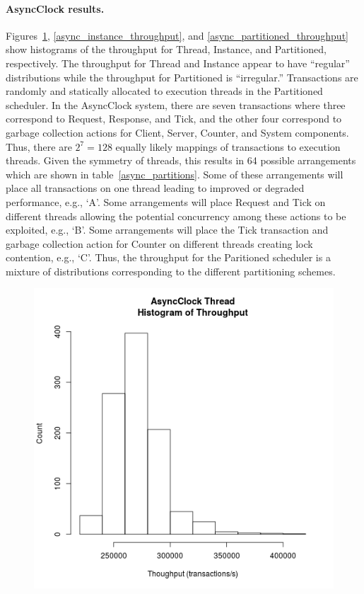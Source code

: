\paragraph{AsyncClock results.}
Figures~\ref{async_thread_throughput}, \ref{async_instance_throughput}, and \ref{async_partitioned_throughput} show histograms of the throughput for Thread, Instance, and Partitioned, respectively.
The throughput for Thread and Instance appear to have ``regular'' distributions while the throughput for Partitioned is ``irregular.''
Transactions are randomly and statically allocated to execution threads in the Partitioned scheduler.
In the AsyncClock system, there are seven transactions where three correspond to Request, Response, and Tick, and the other four correspond to garbage collection actions for Client, Server, Counter, and System components.
Thus, there are $2^7 = 128$ equally likely mappings of transactions to execution threads.
Given the symmetry of threads, this results in 64 possible arrangements which are shown in table~\ref{async_partitions}.
Some of these arrangements will place all transactions on one thread leading to improved or degraded performance, e.g., `A'.
Some arrangements will place Request and Tick on different threads allowing the potential concurrency among these actions to be exploited, e.g., `B'.
Some arrangements will place the Tick transaction and garbage collection action for Counter on different threads creating lock contention, e.g., `C'.
Thus, the throughput for the Paritioned scheduler is a mixture of distributions corresponding to the different partitioning schemes.

\begin{figure}
\center
\includegraphics[height=.4\textheight]{async_thread_throughput_hist.png}
\caption{\label{async_thread_throughput}}
\end{figure}

